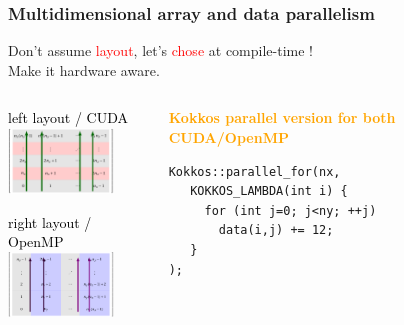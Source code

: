 \begin{frame}[fragile=singleslide]
  \frametitle{Multidimensional array and data parallelism}

  \begin{center}
    {\Large Don't assume \textcolor{red}{layout}, let's \textcolor{red}{chose} at compile-time !\\
    Make it hardware aware.}
  \end{center}
  
  \begin{columns}
    \begin{column}{0.45\textwidth}
      \begin{center}
        \textcolor{black}{\large left layout / CUDA}\\
        \includegraphics[width=2.8cm]{images/tikz/row-major-cuda}

        \textcolor{black}{\large right layout / OpenMP}\\
        \includegraphics[width=2.8cm]{images/tikz/col-major-kokkos-openmp}

      \end{center}
    \end{column}
    \begin{column}{0.45\textwidth}
      \begin{center}
        \textcolor{orange}{\bf Kokkos parallel version for both CUDA/OpenMP}
      \end{center}
      \begin{verbatim}
Kokkos::parallel_for(nx,
   KOKKOS_LAMBDA(int i) {
     for (int j=0; j<ny; ++j)
       data(i,j) += 12;
   }
);
      \end{verbatim}
    \end{column}
    \hfill
  \end{columns}
\end{frame}
